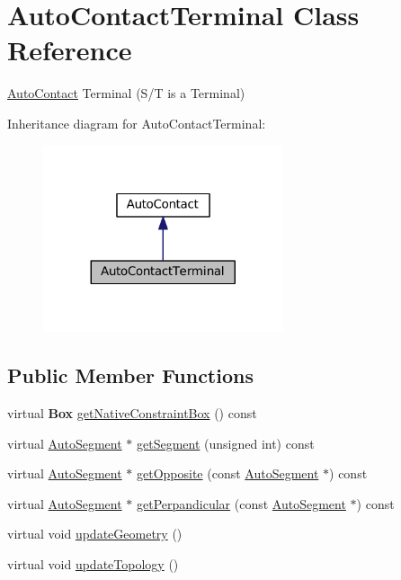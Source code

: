 \hypertarget{classKatabatic_1_1AutoContactTerminal}{}\section{Auto\+Contact\+Terminal Class Reference}
\label{classKatabatic_1_1AutoContactTerminal}


\mbox{\hyperlink{classKatabatic_1_1AutoContact}{Auto\+Contact}} Terminal (S/T is a Terminal)  




Inheritance diagram for Auto\+Contact\+Terminal\+:\nopagebreak
\begin{figure}[H]
\begin{center}
\leavevmode
\includegraphics[width=200pt]{classKatabatic_1_1AutoContactTerminal__inherit__graph}
\end{center}
\end{figure}
\subsection*{Public Member Functions}
\begin{DoxyCompactItemize}
\item 
virtual \textbf{ Box} \mbox{\hyperlink{classKatabatic_1_1AutoContactTerminal_a00ed934305dd186a284b7a13b5798cb6}{get\+Native\+Constraint\+Box}} () const
\item 
virtual \mbox{\hyperlink{classKatabatic_1_1AutoSegment}{Auto\+Segment}} $\ast$ \mbox{\hyperlink{classKatabatic_1_1AutoContactTerminal_a99fa8a78e97a29f2fb5730eaaa59acfc}{get\+Segment}} (unsigned int) const
\item 
virtual \mbox{\hyperlink{classKatabatic_1_1AutoSegment}{Auto\+Segment}} $\ast$ \mbox{\hyperlink{classKatabatic_1_1AutoContactTerminal_ac9c9b04e245a1109e297510a3968b7ac}{get\+Opposite}} (const \mbox{\hyperlink{classKatabatic_1_1AutoSegment}{Auto\+Segment}} $\ast$) const
\item 
virtual \mbox{\hyperlink{classKatabatic_1_1AutoSegment}{Auto\+Segment}} $\ast$ \mbox{\hyperlink{classKatabatic_1_1AutoContactTerminal_ad99dd549214e43b6509fd8e3aefae919}{get\+Perpandicular}} (const \mbox{\hyperlink{classKatabatic_1_1AutoSegment}{Auto\+Segment}} $\ast$) const
\item 
virtual void \mbox{\hyperlink{classKatabatic_1_1AutoContactTerminal_a3e218f6934c51380fb15d0e2bd380071}{update\+Geometry}} ()
\item 
virtual void \mbox{\hyperlink{classKatabatic_1_1AutoContactTerminal_af5bf1f5e71204ef84346e4e036175431}{update\+Topology}} ()
\end{DoxyCompactItemize}
